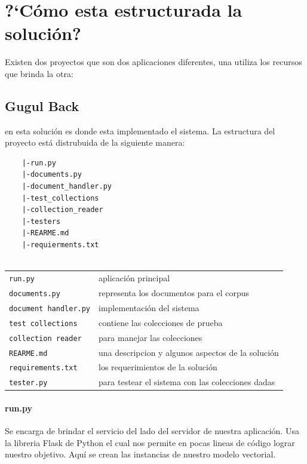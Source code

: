 \documentclass{llncs}
\begin{document}
	
	\section{?`C\'omo esta estructurada la soluci\'on?} 
	Existen dos proyectos que son dos aplicaciones diferentes, una utiliza los recursos que brinda la otra: 
	
	\subsection{Gugul Back}
	en esta soluci\'on es donde esta implementado el sistema. La estructura del proyecto est\'a distrubuida de la siguiente manera:
	
	\begin{verbatim}
	|-run.py
	|-documents.py
	|-document_handler.py
	|-test_collections
	|-collection_reader
	|-testers
	|-REARME.md
	|-requierments.txt
	
	\end{verbatim}
	
	\begin{flushleft}
		\begin{tabular}{@{}p{4cm}l}
			{\tt run.py}  & aplicaci\'on principal\\
			{\tt documents.py}  & representa los documentos para el corpus\\[2pt]
			{\tt document handler.py}& implementaci\'on del sistema\\[2pt]
			{\tt test collections}  & contiene las colecciones de prueba \\[2pt]
			{\tt collection reader}  & para manejar las colecciones \\[2pt]
			{\tt REARME.md}  & una descripcion y algunos aspectos de la soluci\'on \\[2pt]
			{\tt requirements.txt}& los requerimientos de la soluci\'on\\[2pt]			
			{\tt tester.py}  & para testear el sistema con las colecciones dadas\\
		\end{tabular}
	\end{flushleft}
	
	
	\paragraph{run.py} 
	Se encarga de brindar el servicio del lado del servidor de nuestra aplicaci\'on. Usa la libreria Flask de Python el cual nos permite en pocas lineas de c\'odigo lograr nuestro objetivo. Aqu\'i se crean las instancias de nuestro modelo vectorial.
	
\end{document}
